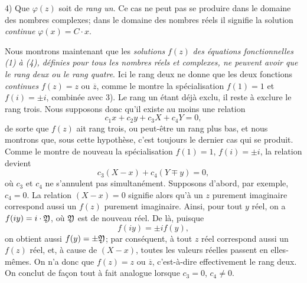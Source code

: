 4) Que $\varphi(z)$ soit de \emph{rang un}. Ce cas ne peut pas se produire dans le domaine des nombres complexes; dans le domaine des nombres réels il signifie la solution \emph{continue} $\varphi(x)=C\cdot x$.

Nous montrons maintenant que les \emph{solutions} $f(z)$ \emph{des équations fonctionnelles (1) à (4), définies pour tous les nombres réels et complexes, ne peuvent avoir que le rang deux ou le rang quatre}. Ici le rang deux ne donne que les deux fonctions \emph{continues} $f(z)=z$ ou $\overline z$, comme le montre la spécialisation $f(1)=1$ et $f(i)=\pm i$, combinée avec 3). Le rang un étant déjà exclu, il reste à exclure le rang trois. Nous supposons donc qu'il existe au moins une relation
\[
c_1x+c_2y+c_3X+c_4Y=0,
\]
de sorte que $f(z)$ ait rang trois, ou peut-être un rang plus bas, et nous montrons que, sous cette hypothèse, c'est toujours le dernier cas qui se produit. Comme le montre de nouveau la spécialisation $f(1)=1$, $f(i)=\pm i$, la relation devient
\[
c_3(X-x)+c_4(Y\mp y)=0,
\]
où $c_3$ et $c_4$ ne s'annulent pas simultanément. Supposons d'abord, par exemple, $c_4=0$. La relation $(X-x)=0$ signifie alors qu'à un $z$ purement imaginaire correspond aussi un $f(z)$ purement imaginaire. Ainsi, pour tout $y$ réel, on a $f(iy)=i\cdot\mathfrak{Y}$, où $\mathfrak{Y}$ est de nouveau réel. De là, puisque
\[
f(iy)=\pm i f(y),
\]
on obtient aussi $f(y)=\pm\mathfrak{Y}$; par conséquent, à tout $z$ réel correspond aussi un $f(z)$ réel, et, à cause de $(X-x)$, toutes les valeurs réelles passent en elles-mêmes. On n'a donc que $f(z)=z$ ou $\overline z$, c'est-à-dire effectivement le rang deux. On conclut de façon tout à fait analogue lorsque $c_3=0$, $c_4\ne0$.

